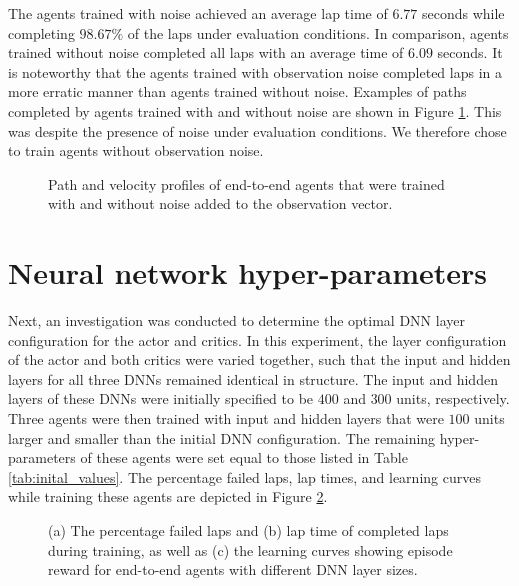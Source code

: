 The agents trained with noise achieved an average lap time of $6.77$ seconds while completing $98.67\%$ of the laps under evaluation conditions. 
In comparison, agents trained without noise completed all laps with an average time of $6.09$ seconds.
It is noteworthy that the agents trained with observation noise completed laps in a more erratic manner than agents trained without noise.
Examples of paths completed by agents trained with and without noise are shown in Figure \ref{fig:noise_lap}.
This was despite the presence of noise under evaluation conditions.
We therefore chose to train agents without observation noise.

\begin{figure}[htb!]
    \centering
    
    \caption[Path and velocity profiles of end-to-end agents that were trained with and without noise added to the observation vector]{Path and velocity profiles of end-to-end agents that were trained with and without noise added to the observation vector.}
    \label{fig:noise_lap}
\end{figure}




\section{Neural network hyper-parameters}

Next, an investigation was conducted to determine the optimal DNN layer configuration for the actor and critics.
In this experiment, the layer configuration of the actor and both critics were varied together, such that the input and hidden layers for all three DNNs remained identical in structure.
The input and hidden layers of these DNNs were initially specified to be $400$ and $300$ units, respectively.
Three agents were then trained with input and hidden layers that were $100$ units larger and smaller than the initial DNN configuration.
The remaining hyper-parameters of these agents were set equal to those listed in Table \ref{tab:inital_values}.
The percentage failed laps, lap times, and learning curves while training these agents are depicted in Figure \ref{fig:layer_sizes}.

\begin{figure}[htb!]
    \centering
    
    \caption[Learning curves for tuning the target update rate]{(a) The percentage failed laps and (b) lap time of completed laps during training, as well as (c) the learning curves showing episode reward for end-to-end agents with different DNN layer sizes.}
    \label{fig:layer_sizes}
\end{figure}


